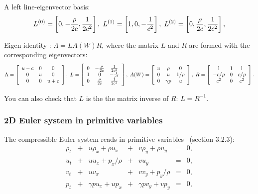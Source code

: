 \documentclass{article}
\begin{document}
A left line-eigenvector basis:
\begin{equation}
  L^{(0)}=\left[0, -\frac{\rho}{2c}, \frac{1}{2c^2}\right],\;\;\\
  L^{(1)}=\left[1, 0, -\frac{1}{c^2} \right],\;\;\\
  L^{(2)}=\left[0, \frac{\rho}{2c}, \frac{1}{2c^2}\right],
\end{equation}

Eigen identity : $\Lambda = L A(W) R$, where the matrix $L$ and $R$ are formed with the corresponding eigenvectors:
\begin{equation}
  \Lambda = \left[
    \begin{array}{ccc}
      u-c& 0 & 0\\
      0  & u & 0\\
      0  & 0 & u+c
    \end{array}
  \right],\;
  L=\left[
    \begin{array}{ccc}
      0 & -\frac{\rho}{2c} & \frac{1}{2c^2}\\
      1 & 0 & -\frac{1}{c^2}\\
      0 & \frac{\rho}{2c} & \frac{1}{2c^2}
    \end{array}
  \right],\;
  A(W)=\left[
    \begin{array}{c c c c}
      u & \rho     & 0 \\
      0 & u        & 1/\rho\\
      0 & \gamma p & u \\
    \end{array}
  \right],\;
  R=\left[
    \begin{array}{ccc}
      1 & 1 & 1\\
      -c/\rho & 0 & c/\rho\\
      c^2 & 0 & c^2
    \end{array}
  \right].
\end{equation}

You can also check that $L$ is the the matrix inverse of $R$: $L = R^{-1}$.

\subsubsection*{2D Euler system in primitive variables}
The compressible Euler system reads in primitive variables~\cite{toro} (section 3.2.3):\\

\begin{equation}
  \begin{array}{ccccccc}
    \rho_t & + & u\rho_x+\rho u_x & + & v\rho_y+\rho u_y & = &0,\\
    u_t    & + & u u_x + p_x/\rho & + & v u_y            & = &0,\\
    v_t    & + & u v_x            & + & v v_y + p_y/\rho & = &0,\\
    p_t    & + & \gamma p u_x + u p_x & + & \gamma p v_y + v p_y & = &0,
  \end{array}
\end{equation}
\end{document}
